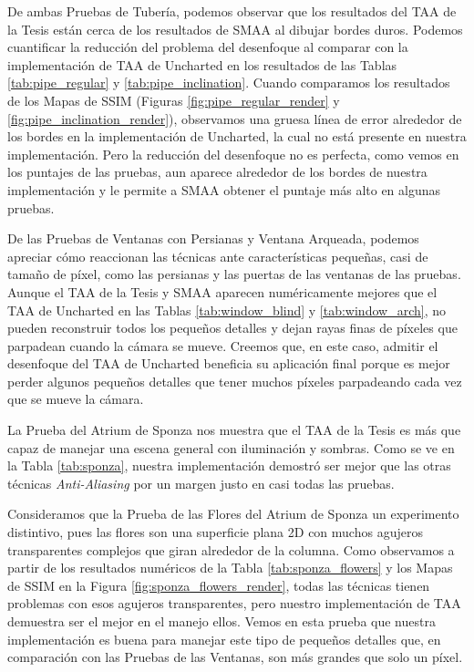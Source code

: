 \documentclass[pregrado]{tesis-usb} %
\begin{document}
De ambas Pruebas de Tubería, podemos observar que los resultados del TAA de la Tesis están cerca de los resultados de SMAA al dibujar bordes duros. Podemos cuantificar la reducción del problema del desenfoque al comparar con la implementación de TAA de Uncharted en los resultados de las Tablas \ref{tab:pipe_regular} y \ref{tab:pipe_inclination}. Cuando comparamos los resultados de los Mapas de SSIM (Figuras \ref{fig:pipe_regular_render} y \ref{fig:pipe_inclination_render}), observamos una gruesa línea de error alrededor de los bordes en la implementación de Uncharted, la cual no está presente en nuestra implementación. Pero la reducción del desenfoque no es perfecta, como vemos en los puntajes de las pruebas, aun aparece alrededor de los bordes de nuestra implementación y le permite a SMAA obtener el puntaje más alto en algunas pruebas.

De las Pruebas de Ventanas con Persianas y Ventana Arqueada, podemos apreciar cómo reaccionan las técnicas ante características pequeñas, casi de tamaño de píxel, como las persianas y las puertas de las ventanas de las pruebas. Aunque el TAA de la Tesis y SMAA aparecen numéricamente mejores que el TAA de Uncharted en las Tablas \ref{tab:window_blind} y \ref{tab:window_arch}, no pueden reconstruir todos los pequeños detalles y dejan rayas finas de píxeles que parpadean cuando la cámara se mueve. Creemos que, en este caso, admitir el desenfoque del TAA de Uncharted beneficia su aplicación final porque es mejor perder algunos pequeños detalles que tener muchos píxeles parpadeando cada vez que se mueve la cámara.

La Prueba del Atrium de Sponza nos muestra que el TAA de la Tesis es más que capaz de manejar una escena general con iluminación y sombras. Como se ve en la Tabla \ref{tab:sponza}, nuestra implementación demostró ser mejor que las otras técnicas \textit{Anti-Aliasing} por un margen justo en casi todas las pruebas.

Consideramos que la Prueba de las Flores del Atrium de Sponza un experimento distintivo, pues las flores son una superficie plana 2D con muchos agujeros transparentes complejos que giran alrededor de la columna. Como observamos a partir de los resultados numéricos de la Tabla \ref{tab:sponza_flowers} y los Mapas de SSIM en la Figura \ref{fig:sponza_flowers_render}, todas las técnicas tienen problemas con esos agujeros transparentes, pero nuestro implementación de TAA demuestra ser el mejor en el manejo ellos. Vemos en esta prueba que nuestra implementación es buena para manejar este tipo de pequeños detalles que, en comparación con las Pruebas de las Ventanas, son más grandes que solo un píxel. 
\end{document}
